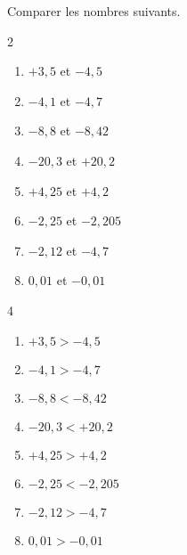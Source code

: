 \begin{exercice*}
    Comparer les nombres suivants.
    \begin{multicols}2
        \begin{enumerate}
            \item $+3,5$ et $-4,5$
            \item $-4,1$ et $-4,7$
            \item $-8,8$ et $-8,42$
            \item $-20,3$ et $+20,2$
            \item $+4,25$ et $+4,2$
            \item $-2,25$ et $-2,205$
            \item $-2,12$ et $-4,7$
            \item $0,01$ et $-0,01$
        \end{enumerate}
    \end{multicols}
\end{exercice*}
\begin{corrige}
    \phantom{rrr}
    \begin{multicols}4
        \begin{enumerate}
            \item $+3,5>-4,5$
            \item $-4,1>-4,7$
            \item $-8,8<-8,42$
            \item $-20,3<+20,2$
            \item $+4,25>+4,2$
            \item $-2,25<-2,205$
            \item $-2,12>-4,7$
            \item $0,01>-0,01$
        \end{enumerate}    
    \end{multicols}
\end{corrige}